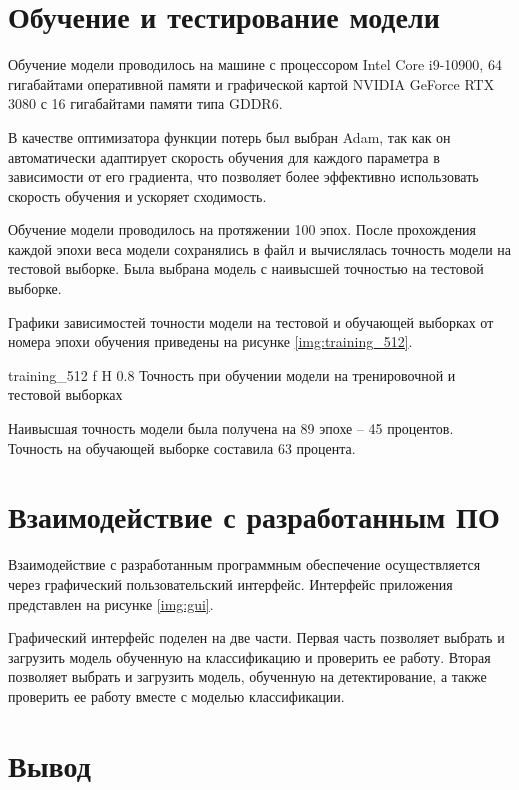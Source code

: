 \section{Обучение и тестирование модели}

Обучение модели проводилось на машине с процессором Intel Core i9-10900, 64 гигабайтами оперативной памяти и графической картой NVIDIA GeForce RTX 3080 с 16 гигабайтами памяти типа GDDR6.

В качестве оптимизатора функции потерь был выбран Adam, так как он автоматически адаптирует скорость обучения для каждого параметра в зависимости от его градиента, что позволяет более эффективно использовать скорость обучения и ускоряет сходимость.

Обучение модели проводилось на протяжении 100 эпох.
После прохождения каждой эпохи веса модели сохранялись в файл и вычислялась точность модели на тестовой выборке.
Была выбрана модель с наивысшей точностью на тестовой выборке.

Графики зависимостей точности модели на тестовой и обучающей выборках от номера эпохи обучения приведены на рисунке \ref{img:training_512}.

{training_512} %
{f} %
{H} %
{0.8\textwidth} %
{Точность при обучении модели на тренировочной и тестовой выборках} %

Наивысшая точность модели была получена на 89 эпохе -- 45 процентов.
Точность на обучающей выборке составила 63 процента.

\section{Взаимодействие с разработанным ПО}

Взаимодействие с разработанным программным обеспечение осуществляется через графический пользовательский интерфейс. Интерфейс приложения представлен на рисунке \ref{img:gui}.


Графический интерфейс поделен на две части. Первая часть позволяет выбрать и загрузить модель обученную на классификацию и проверить ее работу. Вторая позволяет выбрать и загрузить модель, обученную на детектирование, а также проверить ее работу вместе с моделью классификации.

\section{Вывод}

